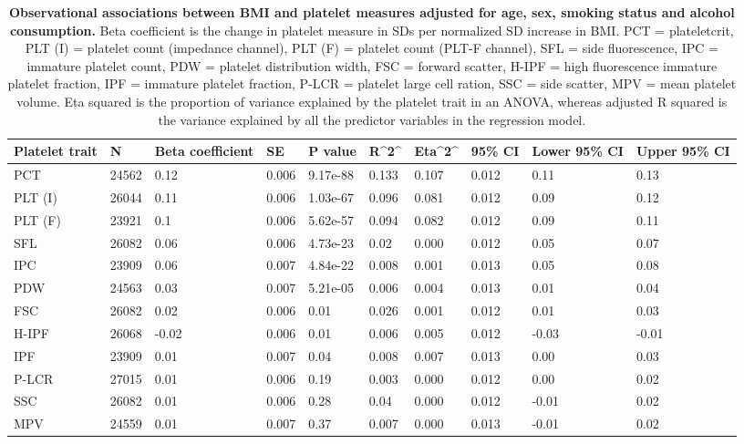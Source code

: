 \documentclass[11pt,twoside]{bristolthesis}
\begin{document}
\begin{landscape}\begin{table}

\caption[Observational associations between BMI and platelet measures adjusted for age, sex, smoking status and alcohol consumption]{\label{tab:BMI-platelets-adjust}\textbf{Observational associations between BMI and platelet measures adjusted for age, sex, smoking status and alcohol consumption.} Βeta coefficient is the change in platelet measure in SDs per normalized SD increase in BMI. PCT = plateletcrit, PLT (I) = platelet count (impedance channel), PLT (F) = platelet count (PLT-F channel), SFL = side fluorescence, IPC = immature platelet count, PDW = platelet distribution width, FSC = forward scatter, H-IPF = high fluorescence immature platelet fraction, IPF = immature platelet fraction, P-LCR = platelet large cell ration, SSC = side scatter, MPV = mean platelet volume. Eta squared is the proportion of variance explained by the platelet trait in an ANOVA, whereas adjusted R squared is the variance explained by all the predictor variables in the regression model.}
\centering
\begin{tabu} to 
\toprule
Platelet trait & N & Βeta coefficient & SE & P value & R\textasciicircum{}2\textasciicircum{} & Eta\textasciicircum{}2\textasciicircum{} & 95\% CI & Lower 95\% CI & Upper 95\% CI\\
\midrule
PCT & 24562 & 0.12 & 0.006 & 9.17e-88 & 0.133 & 0.107 & 0.012 & 0.11 & 0.13\\
PLT (I) & 26044 & 0.11 & 0.006 & 1.03e-67 & 0.096 & 0.081 & 0.012 & 0.09 & 0.12\\
PLT (F) & 23921 & 0.1 & 0.006 & 5.62e-57 & 0.094 & 0.082 & 0.012 & 0.09 & 0.11\\
SFL & 26082 & 0.06 & 0.006 & 4.73e-23 & 0.02 & 0.000 & 0.012 & 0.05 & 0.07\\
IPC & 23909 & 0.06 & 0.007 & 4.84e-22 & 0.008 & 0.001 & 0.013 & 0.05 & 0.08\\
\addlinespace
PDW & 24563 & 0.03 & 0.007 & 5.21e-05 & 0.006 & 0.004 & 0.013 & 0.01 & 0.04\\
FSC & 26082 & 0.02 & 0.006 & 0.01 & 0.026 & 0.001 & 0.012 & 0.01 & 0.03\\
H-IPF & 26068 & -0.02 & 0.006 & 0.01 & 0.006 & 0.005 & 0.012 & -0.03 & -0.01\\
IPF & 23909 & 0.01 & 0.007 & 0.04 & 0.008 & 0.007 & 0.013 & 0.00 & 0.03\\
P-LCR & 27015 & 0.01 & 0.006 & 0.19 & 0.003 & 0.000 & 0.012 & 0.00 & 0.02\\
\addlinespace
SSC & 26082 & 0.01 & 0.006 & 0.28 & 0.04 & 0.000 & 0.012 & -0.01 & 0.02\\
MPV & 24559 & 0.01 & 0.007 & 0.37 & 0.007 & 0.000 & 0.013 & -0.01 & 0.02\\
\bottomrule
\end{tabu}
\end{table}
\end{landscape}
\end{document}
